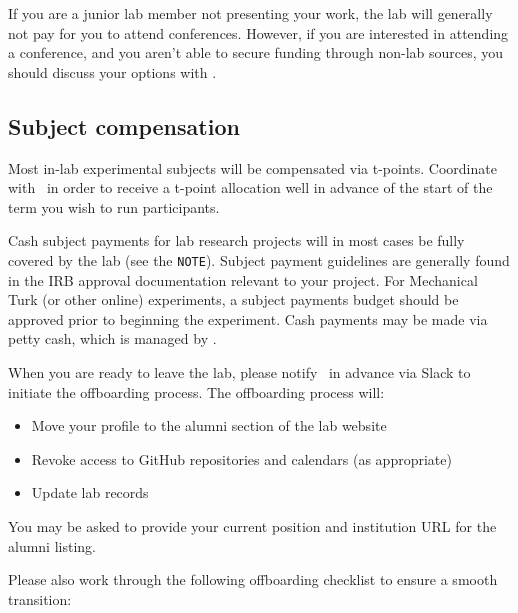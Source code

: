 \documentclass{tufte-book} %
\begin{document}
 If you are a junior lab member not presenting your work, the lab will
 generally not pay for you to attend conferences.  However, if you are
 interested in attending a conference, and you aren't able to secure
 funding through non-lab sources, you should discuss your options with
 \director.

 \subsection{Subject compensation}
 Most in-lab experimental subjects will be compensated via t-points.
 Coordinate with \coordinator~in order to receive a t-point allocation
 well in advance of the start of the term you wish to run
 participants.

   Cash
 subject payments for lab research projects will in most cases be
 fully covered by the lab (see the \texttt{NOTE}).  Subject payment
 guidelines are generally found in the IRB approval documentation
 relevant to your project.  For Mechanical Turk (or other online) experiments, a subject
 payments budget should be approved prior to beginning the experiment.
 Cash payments may be made via petty cash, which is managed by
 \coordinator.

\label{sec: offboarding}

\noindent When you are ready to leave the lab, please notify \director~in advance via Slack to initiate the offboarding process. The offboarding process will:
\begin{itemize}
\item Move your profile to the alumni section of the lab website
\item Revoke access to GitHub repositories and calendars (as appropriate)
\item Update lab records
\end{itemize}
You may be asked to provide your current position and institution URL for the alumni listing.

Please also work through the following offboarding checklist to ensure a smooth transition:
\end{document}
